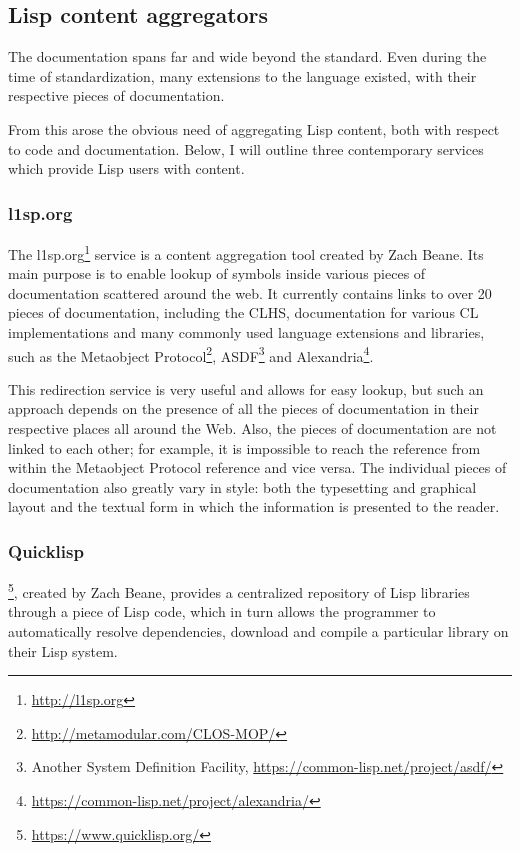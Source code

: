 \subsection{Lisp content aggregators}

The \cl{} documentation spans far and wide beyond the \cl{} standard. Even during the time of \cl{} standardization, many extensions to the language existed, with their respective pieces of documentation.

From this arose the obvious need of aggregating Lisp content, both with respect to code and documentation. Below, I will outline three contemporary services which provide Lisp users with content.

\subsubsection{l1sp.org}

The l1sp.org\footnote{\url{http://l1sp.org}} service is a content aggregation tool created by Zach Beane. Its main purpose is to enable lookup of symbols inside various pieces of documentation scattered around the web. It currently contains links to over 20 pieces of documentation, including the CLHS, documentation for various CL implementations and many commonly used language extensions and libraries, such as the Metaobject Protocol\footnote{\url{http://metamodular.com/CLOS-MOP/}}, ASDF\footnote{Another System Definition Facility, \url{https://common-lisp.net/project/asdf/}} and Alexandria\footnote{\url{https://common-lisp.net/project/alexandria/}}.

This redirection service is very useful and allows for easy lookup, but such an approach depends on the presence of all the pieces of documentation in their respective places all around the Web. Also, the pieces of documentation are not linked to each other; for example, it is impossible to reach the \cl{} reference from within the Metaobject Protocol reference and vice versa. The individual pieces of documentation also greatly vary in style: both the typesetting and graphical layout and the textual form in which the information is presented to the reader.

\subsubsection{Quicklisp}

\ql{}\footnote{\url{https://www.quicklisp.org/}}, created by Zach Beane, provides a centralized repository of Lisp libraries through a piece of Lisp code, which in turn allows the programmer to automatically resolve dependencies, download and compile a particular library on their Lisp system.

